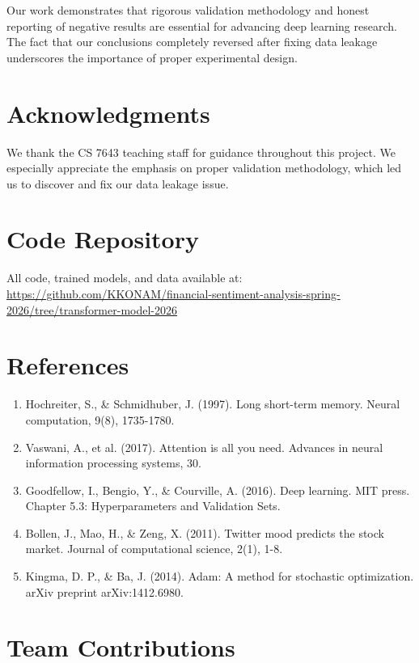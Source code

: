 \documentclass[10pt,twocolumn]{article}
\begin{document}
Our work demonstrates that rigorous validation methodology and honest reporting of negative results are essential for advancing deep learning research. The fact that our conclusions completely reversed after fixing data leakage underscores the importance of proper experimental design.

\section*{Acknowledgments}

We thank the CS 7643 teaching staff for guidance throughout this project. We especially appreciate the emphasis on proper validation methodology, which led us to discover and fix our data leakage issue.

\section*{Code Repository}

All code, trained models, and data available at:\\
\url{https://github.com/KKONAM/financial-sentiment-analysis-spring-2026/tree/transformer-model-2026}

\newpage

\section*{References}

\begin{enumerate}
\item Hochreiter, S., \& Schmidhuber, J. (1997). Long short-term memory. Neural computation, 9(8), 1735-1780.
\item Vaswani, A., et al. (2017). Attention is all you need. Advances in neural information processing systems, 30.
\item Goodfellow, I., Bengio, Y., \& Courville, A. (2016). Deep learning. MIT press. Chapter 5.3: Hyperparameters and Validation Sets.
\item Bollen, J., Mao, H., \& Zeng, X. (2011). Twitter mood predicts the stock market. Journal of computational science, 2(1), 1-8.
\item Kingma, D. P., \& Ba, J. (2014). Adam: A method for stochastic optimization. arXiv preprint arXiv:1412.6980.
\end{enumerate}

\newpage

\section*{Team Contributions}
\end{document}
